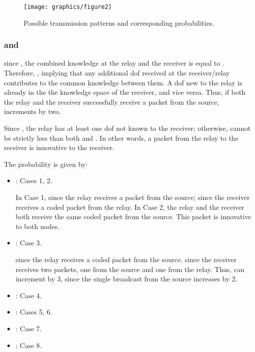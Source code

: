 \begin{figure}[tbp]
\begin{center}
\texttt{[image: graphics/figure2]}
\caption{Possible transmission patterns and corresponding probabilities.}
\label{fig:statetransitions}\vspace*{-.4cm}
\end{center}
\end{figure}

\subsubsection{ and }\label{sec:case_a} since , the combined knowledge at the relay and the receiver is equal to . Therefore, , implying that any additional dof received at the receiver/relay contributes to the common knowledge  between them.
A dof new to the relay is already in the the knowledge space of the receiver, and vice versa. Thus, if both the relay and the receiver successfully receive a packet from the source,  increments by two. 

Since , the relay has at least one dof not known to the receiver; otherwise,  cannot be strictly less than both  and . In other words, a packet from the relay to the receiver is innovative to the receiver.



The probability  is given by:
	    \begin{itemize}
            \item : Cases 1, 2.

                In Case 1,  since the relay receives a  packet from the source;  since the receiver receives a coded packet from the relay.                 In Case 2, the relay and the receiver both receive the same coded packet from the source. This packet is innovative to both nodes.

            \item : Case 3. 
            
                since the relay receives a coded packet from the source.  since the receiver receives two packets, one from the source and one from the relay. Thus,  can increment by 3, since the single broadcast from the source increases  by 2. 

            \item : Case 4. 


            \item : Cases 5, 6.

            \item : Case 7.

	    \item : Case 8.
        \end{itemize}

